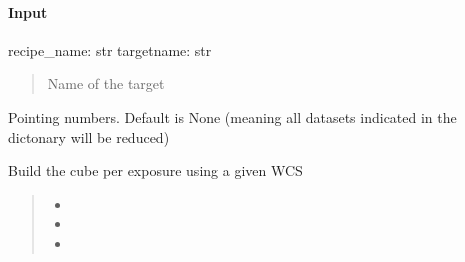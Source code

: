 \documentclass[letterpaper,10pt,english]{sphinxmanual}
\begin{document}
\begin{fulllineitems}
\begin{fulllineitems}
\paragraph{Input}
\label{\detokenize{api/pymusepipe:id117}}
\sphinxAtStartPar
recipe\_name: str
targetname: str
\begin{quote}

\sphinxAtStartPar
Name of the target
\end{quote}
\begin{description}
\sphinxAtStartPar
Pointing numbers. Default is None (meaning all datasets
indicated in the dictonary will be reduced)

\end{description}

\end{fulllineitems}


\begin{fulllineitems}
\label{\detokenize{api/pymusepipe:pymusepipe.target_sample.MusePipeSample.run_target_scipost_perexpo}}
\pysigstartsignatures
{}
\pysigstopsignatures
\sphinxAtStartPar
Build the cube per exposure using a given WCS
\begin{quote}\begin{description}
\begin{itemize}
\item {} 
\sphinxAtStartPar
{} \textendash{} 

\item {} 
\sphinxAtStartPar
{} \textendash{} 

\item {} 
\sphinxAtStartPar
{} \textendash{} 


\end{itemize}
\end{description}
\end{quote}
\end{fulllineitems}
\end{fulllineitems}
\end{document}
